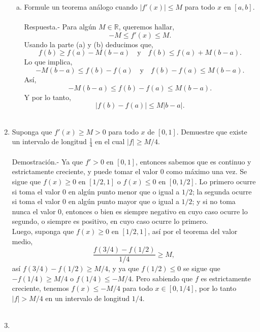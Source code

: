 \begin{enumerate}[\bfseries 1.]
\begin{enumerate}[(a)]
	    \item Formule un teorema análogo cuando $|f'(x)|\leq M$ para todo $x$ en $[a,b]$.\\\\
		Respuesta.-\; Para algún $M\in \mathbb{R}$, queremos hallar, 
		$$-M\leq f'(x)\leq M.$$
		Usando la parte (a) y (b) deducimos que,
		$$f(b)\geq f(a)-M(b-a)\quad \mbox{y}\quad f(b)\leq f(a)+M(b-a).$$
		Lo que implica,
		$$-M(b-a)\leq f(b)-f(a)\quad \mbox{y}\quad f(b)-f(a)\leq M(b-a).$$
		Así,
		$$-M(b-a)\leq f(b)-f(a)\leq M(b-a).$$
		Y por lo tanto,
		$$|f(b)-f(a)|\leq M|b-a|.$$\\

	\end{enumerate}

    \item Suponga que $f'(x)\geq M>0$ para todo $x$ de $[0,1]$. Demuestre que existe un intervalo de longitud $\frac{1}{4}$ en el cual $|f|\geq M/4$.\\\\
	Demostración.-\; Ya que $f'>0$ en $[0,1]$, entonces sabemos que es continuo y estrictamente creciente, y  puede tomar el valor $0$ como máximo una vez. Se sigue que $f(x)\geq 0$ en $[1/2,1]$ o $f(x)\leq 0$ en $[0,1/2]$. Lo primero ocurre si toma el valor $0$ en algún punto menor que o igual a $1/2$; la segunda ocurre si toma el valor $0$ en algún punto mayor que o igual a $1/2$; y si no toma nunca el valor $0$, entonces o bien es siempre negativo en cuyo caso ocurre lo segundo, o siempre es positivo, en cuyo caso ocurre lo primero.\\
	Luego, suponga que $f(x)\geq 0$ en $[1/2,1]$, así por el teorema del valor medio, 
	$$\dfrac{f(3/4)-f(1/2)}{1/4}\geq M,$$ 
	así $f(3/4)-f(1/2)\geq M/4$, y ya que $f(1/2)\leq 0$ se sigue que $-f(1/4)\geq M/4$ o $f(1/4)\leq -M/4$. Pero sabiendo que $f$ es estrictamente creciente, tenemos $f(x)\leq-M/4$ para todo $x\in[0,1/4]$, por lo tanto $|f|>M/4$ en un intervalo de longitud $1/4$.\\\\

    \item 
	\begin{enumerate}[(a)]


\end{enumerate}
\end{enumerate}
